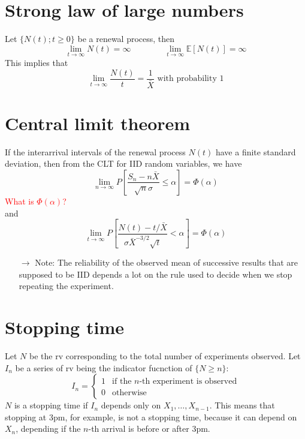 \documentclass[12pt, openany]{report}
\newcommand{\E}{\mathbb{E}}
\theoremstyle{definition}
\begin{document}
\section{Strong law of large numbers}
Let $\{N(t);t\ge 0\}$ be a renewal process, then 
\begin{equation}
  \lim_{t\to \infty} N(t) = \infty \qquad \qquad \lim_{t\to \infty} \E[N(t)] = \infty 
\end{equation}
This implies that 
\begin{equation}
  \lim_{t\to \infty} \frac{N(t)}{t} = \frac{1}{\bar X} \text{ with probability 1}
\end{equation}
\section{Central limit theorem}
If the interarrival intervals of the renewal process $N(t)$ have a finite standard deviation, then from the CLT for IID random variables, we have 
\begin{equation}
  \lim_{n\to \infty} P\left[\frac{S_n-n\bar X}{\sqrt{n}\sigma}\le \alpha\right] = \Phi(\alpha)
\end{equation}
\textcolor{red}{What is $\Phi(\alpha)$?}\\
and 
\begin{equation}
  \lim_{t\to \infty} P\left[\frac{N(t)-t/\bar X}{\sigma \bar X^{-3/2}\sqrt{t}}<\alpha \right] = \Phi(\alpha)
\end{equation}
\begin{itemize}
  \item [$\to$] Note: The reliability of the observed mean of successive results that are supposed to be IID depends a lot on the rule used to decide when we stop repeating the experiment.
\end{itemize}
\section{Stopping time}
Let $N$ be the rv corresponding to the total number of experiments observed. Let $I_n$ be a series of rv being the indicator fucnction of $\{N\ge n\}$:
\begin{equation}
  I_n = \begin{cases}
    1 & \text{if the $n$-th experiment is observed}\\
    0 & \text{otherwise}
  \end{cases}
\end{equation}
$N$ is a stopping time if $I_n$ depends only on $X_1,\dots,X_{n-1}$. This means that stopping at 3pm, for example, is not a stopping time, because it can depend on $X_n$, depending if the $n$-th arrival is before or after 3pm.\\
\end{document}
